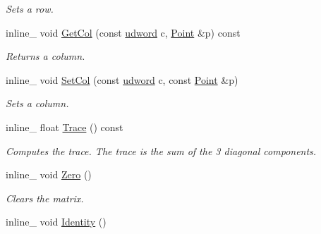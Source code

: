 \begin{DoxyCompactItemize}
\begin{DoxyCompactList}\small\item\em Sets a row. \end{DoxyCompactList}\item 
inline\+\_\+ void \hyperlink{classOpcode_1_1Matrix3x3_ab10d1ec4bb72230c72a93828837ffcd2}{Get\+Col} (const \hyperlink{IceTypes_8h_a44c6f1920ba5551225fb534f9d1a1733}{udword} c, \hyperlink{classOpcode_1_1Point}{Point} \&p) const \hypertarget{classOpcode_1_1Matrix3x3_ab10d1ec4bb72230c72a93828837ffcd2}{}\label{classOpcode_1_1Matrix3x3_ab10d1ec4bb72230c72a93828837ffcd2}

\begin{DoxyCompactList}\small\item\em Returns a column. \end{DoxyCompactList}\item 
inline\+\_\+ void \hyperlink{classOpcode_1_1Matrix3x3_a885ca85d5e736b61f7e77ed682bc8e25}{Set\+Col} (const \hyperlink{IceTypes_8h_a44c6f1920ba5551225fb534f9d1a1733}{udword} c, const \hyperlink{classOpcode_1_1Point}{Point} \&p)\hypertarget{classOpcode_1_1Matrix3x3_a885ca85d5e736b61f7e77ed682bc8e25}{}\label{classOpcode_1_1Matrix3x3_a885ca85d5e736b61f7e77ed682bc8e25}

\begin{DoxyCompactList}\small\item\em Sets a column. \end{DoxyCompactList}\item 
inline\+\_\+ float \hyperlink{classOpcode_1_1Matrix3x3_a68215689b86b979f61a8da29a5194345}{Trace} () const \hypertarget{classOpcode_1_1Matrix3x3_a68215689b86b979f61a8da29a5194345}{}\label{classOpcode_1_1Matrix3x3_a68215689b86b979f61a8da29a5194345}

\begin{DoxyCompactList}\small\item\em Computes the trace. The trace is the sum of the 3 diagonal components. \end{DoxyCompactList}\item 
inline\+\_\+ void \hyperlink{classOpcode_1_1Matrix3x3_a88580858346e18869337652ea3b95cb3}{Zero} ()\hypertarget{classOpcode_1_1Matrix3x3_a88580858346e18869337652ea3b95cb3}{}\label{classOpcode_1_1Matrix3x3_a88580858346e18869337652ea3b95cb3}

\begin{DoxyCompactList}\small\item\em Clears the matrix. \end{DoxyCompactList}\item 
inline\+\_\+ void \hyperlink{classOpcode_1_1Matrix3x3_af39e198ab36cd9e9a6e556cfc3bfab8b}{Identity} ()\hypertarget{classOpcode_1_1Matrix3x3_af39e198ab36cd9e9a6e556cfc3bfab8b}{}\label{classOpcode_1_1Matrix3x3_af39e198ab36cd9e9a6e556cfc3bfab8b}


\end{DoxyCompactItemize}
